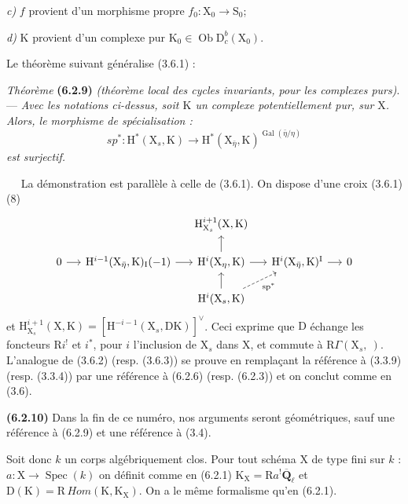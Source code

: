 \documentclass[11pt,leqno]{article}
\newcommand{\Page}[1]{\ifvmode\noindent\else\unskip\ \fi{\footnotesize\textcolor{gray}{[p.\,#1]}}\ \ignorespaces}
\begin{document}
\textit{c)} \(f\) provient d’un morphisme propre
\(f_0:\mathrm{X}_0\to\mathrm{S}_0\);

\textit{d)} \(\mathrm{K}\) provient d’un complexe pur
\(\mathrm{K}_0\in\operatorname{Ob}\mathrm{D}_c^b(\mathrm{X}_0)\).

Le théorème suivant généralise (3.6.1) :

\textit{Théorème} \textbf{(6.2.9)}
\textit{(théorème local des cycles invariants, pour les complexes purs)}.
— \textit{Avec les notations ci-dessus, soit \(\mathrm{K}\) un
complexe potentiellement pur, sur \(\mathrm{X}\). Alors, le morphisme
de spécialisation :}
\[
\mathit{sp}^*:\mathrm{H}^*(\mathrm{X}_s,\mathrm{K})
\to\mathrm{H}^*(\mathrm{X}_{\bar{\eta}},\mathrm{K})^{
\operatorname{Gal}(\bar{\eta}/\eta)}
\]
\textit{est surjectif.}

\Page{249}
La démonstration est parallèle à celle de (3.6.1). On dispose d’une croix (3.6.1) (8)
\[
\begin{tikzcd}[column sep=1.3em, row sep=1.5em]
& & \mathrm{H}^{i+1}_{\mathrm{X}_s}(\mathrm{X},\mathrm{K}) & & \\
0 \arrow[r]
& \mathrm{H}^{i-1}(\mathrm{X}_{\bar{\eta}},\mathrm{K})_{\mathrm{I}}(-1) \arrow[r]
& \mathrm{H}^{i}(\mathrm{X}_{\eta},\mathrm{K}) \arrow[u] \arrow[r]
& \mathrm{H}^{i}(\mathrm{X}_{\bar{\eta}},\mathrm{K})^{\mathrm{I}} \arrow[r]
& 0 \\
& & \mathrm{H}^{i}(\mathrm{X}_s,\mathrm{K})
    \arrow[u]
    \arrow[ur, dashed, "\mathrm{sp}^{*}"']
& &
\end{tikzcd}
\]
et \(\mathrm{H}^{i+1}_{\mathrm{X}_s}(\mathrm{X},\mathrm{K})
=[\mathrm{H}^{-i-1}(\mathrm{X}_s,\mathrm{DK})]^{\vee}\).
Ceci exprime que \(\mathrm{D}\) échange les foncteurs \(\mathrm{R}i^!\) et \(i^*\), pour \(i\) l’inclusion de \(\mathrm{X}_s\) dans \(\mathrm{X}\), et commute à \(\mathrm{R}\Gamma(\mathrm{X}_s,\ )\). L’analogue de (3.6.2) (resp. (3.6.3)) se prouve en remplaçant la référence à (3.3.9) (resp. (3.3.4)) par une référence à (6.2.6) (resp. (6.2.3)) et on conclut comme en (3.6).

\textbf{(6.2.10)} Dans la fin de ce numéro, nos arguments seront géométriques, sauf une référence à (6.2.9) et une référence à (3.4).

Soit donc \(k\) un corps algébriquement clos. Pour tout schéma \(\mathrm{X}\) de type fini sur \(k\) : \(a:\mathrm{X}\to\operatorname{Spec}(k)\) on définit comme en (6.2.1) \(\mathrm{K}_{\mathrm{X}}=\mathrm{R}a^!\overline{\mathbf{Q}}_{\ell}\) et \(\mathrm{D}(\mathrm{K})=\mathrm{R}\,\mathit{Hom}(\mathrm{K},\mathrm{K}_{\mathrm{X}})\). On a le même formalisme qu’en (6.2.1).
\end{document}
